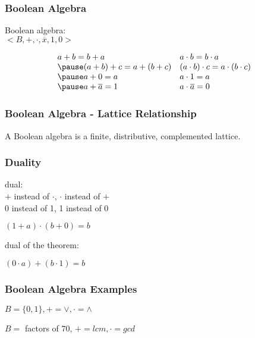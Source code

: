 \documentclass[dvipsnames]{beamer}
\begin{document}
\begin{frame}
  \frametitle{Boolean Algebra}

  \begin{definition}
    \alert{Boolean algebra}:\\
    $<B,+,\cdot,\overline{x},1,0>$

    \pause
    \[\begin{array}{ll}
      a + b = b + a &
      a \cdot b = b \cdot a\\ \pause
      (a + b) + c = a + (b + c) &
      (a \cdot b) \cdot c = a \cdot (b \cdot c)\\ \pause
      a + 0 = a &
      a \cdot 1 = a\\ \pause
      a + \overline{a} = 1 &
      a \cdot \overline{a} = 0
    \end{array}\]
  \end{definition}
\end{frame}

\begin{frame}
  \frametitle{Boolean Algebra - Lattice Relationship}

  \begin{definition}
    A Boolean algebra is a finite, distributive, complemented lattice.
  \end{definition}
\end{frame}

\begin{frame}
  \frametitle{Duality}

  \begin{definition}
    \alert{dual}:\\
    $+$ instead of $\cdot$, $\cdot$ instead of $+$\\
    0 instead of 1, 1 instead of 0
  \end{definition}

  \pause
  \begin{example}
    $(1 + a) \cdot (b + 0) = b$

    dual of the theorem:

    $(0 \cdot a) + (b \cdot 1) = b$
  \end{example}
\end{frame}

\begin{frame}
  \frametitle{Boolean Algebra Examples}

  \begin{example}
    $B = \{0,1\}, + = \vee, \cdot = \wedge$
  \end{example}

  \pause
  \begin{example}
    $B = $ factors of $70$, $+ = lcm, \cdot = gcd$
  \end{example}
\end{frame}
\end{document}
